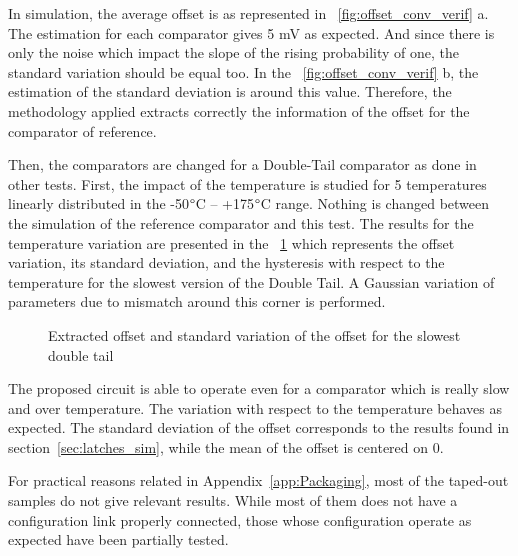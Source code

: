 In simulation, the average offset is as represented in \figurename~\ref{fig:offset_conv_verif} a. The estimation for each comparator gives 5 mV as expected. And since there is only the noise which impact the slope of the rising probability of one, the standard variation should be equal too. In the \figurename~\ref{fig:offset_conv_verif} b, the estimation of the standard deviation is around this value. Therefore, the methodology applied extracts correctly the information of the offset for the comparator of reference.

Then, the comparators are changed for a Double-Tail comparator as done in other tests. First, the impact of the temperature is studied for 5 temperatures linearly distributed in the -50$\degree$C -- +175$\degree$C range. Nothing is changed between the simulation of the reference comparator and this test.
The results for the temperature variation are presented in the \figurename~\ref{fig:offset_conv_dtl} which represents the offset variation, its standard deviation, and the hysteresis with respect to the temperature for the slowest version of the Double Tail. A Gaussian variation of parameters due to mismatch around this corner is performed.

\begin{figure}[htp]
    \centering
    \begin{subfigure}[b]{0.32\textwidth}
    \end{subfigure}
    \begin{subfigure}[b]{0.32\textwidth}
    \end{subfigure}
    \begin{subfigure}[b]{0.32\textwidth}
    \end{subfigure}
    \caption{Extracted offset and standard variation of the offset for the slowest double tail}
    \label{fig:offset_conv_dtl}
\end{figure}

The proposed circuit is able to operate even for a comparator which is really slow and over temperature. The variation with respect to the temperature behaves as expected. The standard deviation of the offset corresponds to the results found in section~\ref{sec:latches_sim}, while the mean of the offset is centered on 0.

For practical reasons related in Appendix~\ref{app:Packaging}, most of the taped-out samples do not give relevant results. While most of them does not have a configuration link properly connected, those whose configuration operate as expected have been partially tested.
